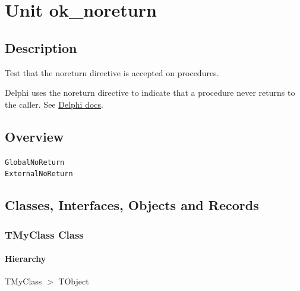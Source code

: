 \documentclass{report}
\newif\ifpdf
\begin{document}
\label{toc}\tableofcontents
\newpage
\newlength{\tmplength}
\chapter{Unit ok{\_}noreturn}
\label{ok_noreturn}
\section{Description}
Test that the noreturn directive is accepted on procedures.\hfill\vspace*{1ex}

 Delphi uses the noreturn directive to indicate that a procedure never returns to the caller. See \href{https://docwiki.embarcadero.com/RADStudio/Florence/en/Declarations_and_Statements_(Delphi)#The_noreturn_Directive}{Delphi docs}.
\section{Overview}
\begin{description}
\item[\texttt{\begin{ttfamily}TMyClass\end{ttfamily} Class}]
\end{description}
\begin{description}
\item[\texttt{GlobalNoReturn}]
\item[\texttt{ExternalNoReturn}]
\end{description}
\section{Classes, Interfaces, Objects and Records}
\ifpdf
\subsection*{\large{\textbf{TMyClass Class}}\normalsize\hspace{1ex}\hrulefill}
\else
\subsection*{TMyClass Class}
\fi
\label{ok_noreturn.TMyClass}
\subsubsection*{\large{\textbf{Hierarchy}}\normalsize\hspace{1ex}\hfill}
TMyClass {$>$} TObject
\end{document}
